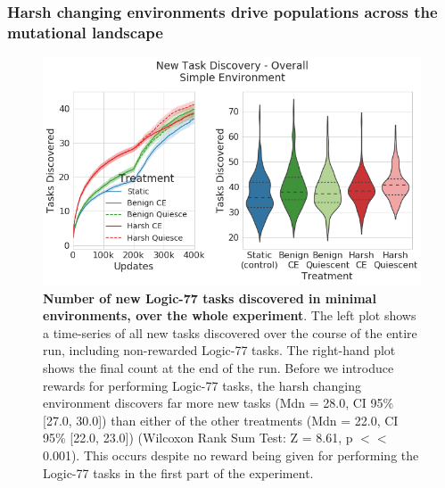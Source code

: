 \documentclass[PhD]{msu-thesis}
\begin{document}
\subsubsection{Harsh changing environments drive populations across the mutational landscape}
	\begin{figure}[!h]
	\includegraphics[width=0.95\columnwidth]{figures/LTE/lte-simple-overall_task_discovery.png}
	\caption{\textbf{Number of new Logic-77 tasks discovered in minimal environments, over the whole experiment}. The left plot shows a time-series of all new tasks discovered over the course of the entire run, including non-rewarded Logic-77 tasks. The right-hand plot shows the final count at the end of the run. Before we introduce rewards for performing Logic-77 tasks, the harsh changing environment discovers far more new tasks (Mdn = 28.0, CI 95\% [27.0, 30.0]) than either of the other treatments (Mdn = 22.0, CI 95\% [22.0, 23.0]) (Wilcoxon Rank Sum Test: Z = 8.61, p $<<$ 0.001). This occurs despite no reward being given for performing the Logic-77 tasks in the first part of the experiment. %
	}
	\label{fig:simple-overall_task_discovery}
	\end{figure}
\end{document}
